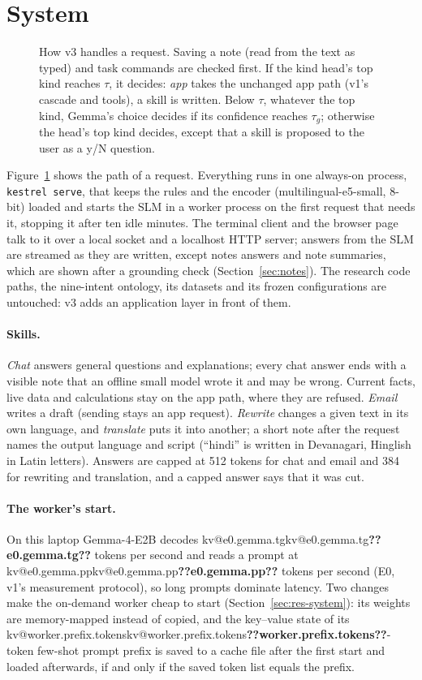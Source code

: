 \documentclass[11pt,a4paper]{article}
\makeatletter
\DeclareRobustCommand{\kv}[1]{\ifcsname kv@#1\endcsname\csname kv@#1\endcsname\else\textbf{??#1??}\fi}
\makeatother
\begin{document}
\section{System}\label{sec:system}

\begin{figure}[t]
\centering

\caption{How v3 handles a request. Saving a note (read from the text as typed) and task commands are checked first. If the
kind head's top kind reaches $\tau$, it decides: \emph{app} takes the unchanged app path (v1's cascade and tools), a
skill is written. Below $\tau$, whatever the top kind, Gemma's choice decides if its confidence reaches $\tau_g$;
otherwise the head's top kind decides, except that a skill is proposed to the user as a y/N question.}
\label{fig:arch}
\end{figure}

Figure~\ref{fig:arch} shows the path of a request. Everything runs in one always-on process, \texttt{kestrel serve},
that keeps the rules and the encoder (multilingual-e5-small, 8-bit) loaded and starts the SLM in a worker process on
the first request that needs it, stopping it after ten idle minutes. The terminal client and the browser page talk to
it over a local socket and a localhost HTTP server; answers from the SLM are streamed as they are written, except notes answers and note summaries, which are shown after a
grounding check (Section~\ref{sec:notes}). The research
code paths, the nine-intent ontology, its datasets and its frozen configurations are untouched: v3 adds an application
layer in front of them.

\paragraph{Skills.} \emph{Chat} answers general questions and explanations; every chat answer ends with a visible note
that an offline small model wrote it and may be wrong. Current facts, live data and calculations stay on the app path,
where they are refused. \emph{Email} writes a draft (sending stays an app request). \emph{Rewrite} changes a given text
in its own language, and \emph{translate} puts it into another; a short note after the request names the output
language and script (``hindi'' is written in Devanagari, Hinglish in Latin letters). Answers are capped at 512 tokens
for chat and email and 384 for rewriting and translation, and a capped answer says that it was cut.

\paragraph{The worker's start.} On this laptop Gemma-4-E2B decodes \kv{e0.gemma.tg} tokens per second and reads a
prompt at \kv{e0.gemma.pp} tokens per second (E0, v1's measurement protocol), so long prompts dominate latency. Two
changes make the on-demand worker cheap to start (Section~\ref{sec:res-system}): its weights are memory-mapped instead
of copied, and the key--value state of its \kv{worker.prefix.tokens}-token few-shot prompt prefix is saved to a cache
file after the first start and loaded afterwards, if and only if the saved token list equals the prefix.
\end{document}
